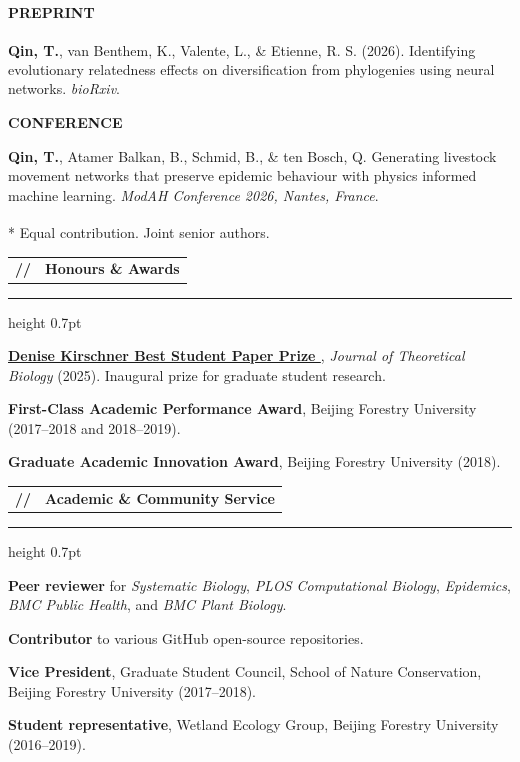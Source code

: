 \documentclass[10pt,a4paper]{article}
\makeatletter
\newcommand{\cvsection}[1]{%
  \Needspace{4\baselineskip}%
  \vspace{0.72em}%
  \noindent
  \begin{tabularx}{\textwidth}{@{}l@{\hspace{0.58em}}X@{}}
    {\color{Teal}\ttfamily\bfseries //} &
    {\large\bfseries\color{Teal} #1}
  \end{tabularx}
  \vspace{0.16em}\par
  {\color{Line}\hrule height 0.7pt}
  \vspace{0.42em}
}
\newcommand{\cvsubhead}[1]{%
  \Needspace{2.5\baselineskip}%
  \vspace{0.45em}%
  {\small\bfseries\color{Teal}\MakeUppercase{#1}}\par
  \vspace{0.18em}
}
\makeatother
\begin{document}
\cvsubhead{Preprint}

\begin{publist}
    \item \textbf{Qin, T.}, van Benthem, K., Valente, L.\textsuperscript{\dag},
    \& Etienne, R. S.\textsuperscript{\dag} (2026).
    Identifying evolutionary relatedness effects on diversification from phylogenies using neural
    networks. \emph{bioRxiv}.
\end{publist}

\cvsubhead{Conference}

\begin{publist}
    \item \textbf{Qin, T.}, Atamer Balkan, B., Schmid, B., \& ten Bosch, Q.
    Generating livestock movement networks that preserve epidemic behaviour with physics informed
    machine learning. \emph{ModAH Conference 2026, Nantes, France}.
\end{publist}

\vspace{0.35em}
{\small\color{Muted}* Equal contribution. \textsuperscript{\dag} Joint senior authors.}

\cvsection{Honours \& Awards}

\begin{cvlist}
  \item \textbf{\href{https://www.sciencedirect.com/journal/journal-of-theoretical-biology/about/news/the-winner-of-the-denise-kirschner-best-student-paper-prize}
  {Denise Kirschner Best Student Paper Prize }}, \emph{Journal of Theoretical Biology}
  (2025). Inaugural prize for graduate student research.
  \item \textbf{First-Class Academic Performance Award}, Beijing Forestry University
  (2017--2018 and 2018--2019).
  \item \textbf{Graduate Academic Innovation Award}, Beijing Forestry University (2018).
\end{cvlist}

\cvsection{Academic \& Community Service}

\begin{cvlist}
  \item \textbf{Peer reviewer} for \emph{Systematic Biology}, \emph{PLOS Computational Biology},
  \emph{Epidemics}, \emph{BMC Public Health}, and \emph{BMC Plant Biology}.
  \item \textbf{Contributor} to various GitHub open-source repositories.
  \item \textbf{Vice President}, Graduate Student Council, School of Nature Conservation, Beijing Forestry
  University (2017--2018).
  \item \textbf{Student representative}, Wetland Ecology Group, Beijing Forestry University (2016--2019).
\end{cvlist}
\end{document}
